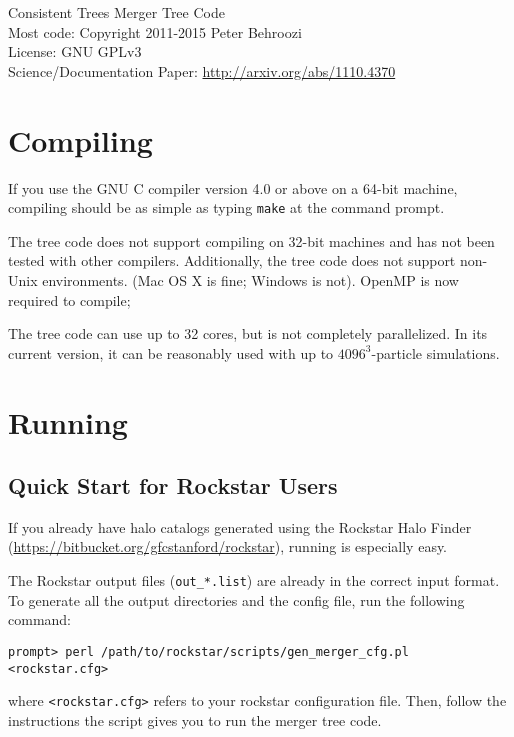 \documentclass[12pt]{article}
\begin{document}
\vspace{-1ex}
\noindent{}Consistent Trees Merger Tree Code\\
\noindent{}Most code: Copyright \textcopyright{}2011-2015 Peter Behroozi\\
\noindent{}License: GNU GPLv3\\
\noindent{}Science/Documentation Paper: \url{http://arxiv.org/abs/1110.4370}\\

\tableofcontents
\newcommand{\ttt}[1]{\texttt{#1}}

\section{Compiling}
      If you use the GNU C compiler version 4.0 or above on a 64-bit machine,
   compiling should be as simple as typing \ttt{make} at the command prompt.

   The tree code does not support compiling on 32-bit machines and has not been
   tested with other compilers.  Additionally, the tree code does not support
   non-Unix environments. (Mac OS X is fine; Windows is not).  OpenMP is
   now required to compile; 

   The tree code can use up to 32 cores, but is not completely parallelized.
   In its current version, it can be reasonably used with up to $4096^3$-particle
   simulations.

\section{Running}
\subsection{Quick Start for Rockstar Users}
      If you already have halo catalogs generated using the Rockstar Halo
      Finder (\url{https://bitbucket.org/gfcstanford/rockstar}), running is especially easy.

      The Rockstar output files (\ttt{out\_*.list}) are already in the correct input
      format.  To generate all the output directories and the config file,
      run the following command:
\begin{verbatim}
prompt> perl /path/to/rockstar/scripts/gen_merger_cfg.pl <rockstar.cfg>
\end{verbatim}
       where \ttt{<rockstar.cfg>} refers to your rockstar configuration file.
      Then, follow the instructions the script gives you to run the merger tree
      code.
\end{document}
